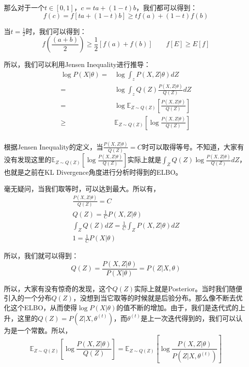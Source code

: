 \documentclass[a4paper]{article}
\begin{document}
那么对于一个$t\in [0,1]$，$c = ta+(1-t)b$，我们都可以得到：
\begin{equation}
    f(c) = f[ta+(1-t)b] \geq tf(a)+(1-t)f(b)
\end{equation}

当$t = \frac{1}{2}$时，我们可以得到：
\begin{equation}
    f(\frac{(a+b)}{2}) \geq \frac{1}{2}[f(a)+f(b)] \qquad f[E] \geq E[f]
\end{equation}

所以，我们可以利用Jensen Inequality进行推导：
\begin{equation}
    \begin{split}
        \log P(X|\theta) 
        = & \log \int_z P(X,Z|\theta) dZ \\
        = & \log \int_z Q(Z) \frac{P(X,Z|\theta)}{Q(Z)} dZ \\
        = & \log \mathbb{E}_{Z\sim Q(Z)}\left[ \frac{P(X,Z|\theta)}{Q(Z)} \right]\\
        \geq & \mathbb{E}_{Z\sim Q(Z)}\left[ \log \frac{P(X,Z|\theta)}{Q(Z)} \right] \\
    \end{split}
\end{equation}

根据Jensen Inequality的定义，当$\frac{P(X,Z|\theta)}{Q(Z)} = C$时可以取得等号。不知道，大家有没有发现这里的$\mathbb{E}_{Z\sim Q(Z)}\left[ \log \frac{P(X,Z|\theta)}{Q(Z)} \right]$实际上就是$\int_Z Q(Z) \log \frac{P(X,Z|\theta)}{Q(Z)}dZ$，也就是之前在KL Divergence角度进行分析时得到的ELBO。

毫无疑问，当我们取等时，可以达到最大。所以有，
\begin{gather}
    \frac{P(X,Z|\theta)}{Q(Z)} = C \\
    Q(Z) = \frac{1}{C} P(X,Z|\theta) \\
    \int_Z Q(Z) dZ = \frac{1}{C} \int_Z P(X,Z|\theta) dZ \\
    1 = \frac{1}{C} P(X|\theta)
\end{gather}

所以，我们就可以得到：
\begin{equation}
    Q(Z) = \frac{P(X,Z|\theta)}{P(X|\theta)} = P(Z|X,\theta)
\end{equation}

所以，大家有没有惊奇的发现，这个$Q(Z)$实际上就是Posterior。当时我们随便引入的一个分布$Q(Z)$，没想到当它取等的时候就是后验分布。那么像不断去优化这个ELBO，从而使得$\log P(X|\theta)$的值不断的增加。由于，我们是迭代式的上升，这里的$Q(Z) = P(Z|X,\theta^{(t)})$，而$\theta^{(t)}$是上一次迭代得到的，我们可以认为是一个常数。所以，
\begin{equation}
    \mathbb{E}_{Z\sim Q(Z)}\left[ \log \frac{P(X,Z|\theta)}{Q(Z)} \right] = \mathbb{E}_{Z\sim Q(Z)}\left[ \log \frac{P(X,Z|\theta)}{P(Z|X,\theta^{(t)})} \right]
\end{equation}
\end{document}
